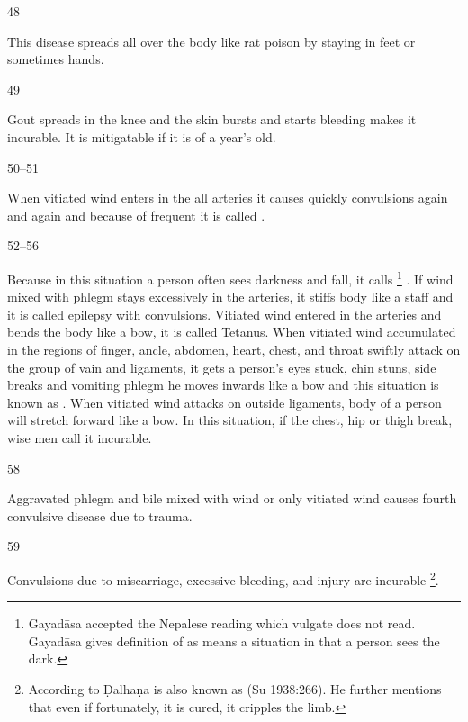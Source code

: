 \begin{translation}
\item[48]

	This disease spreads all over the body like rat poison by staying in
	feet or sometimes hands.

\item[49]

	Gout spreads in the knee and the skin bursts and starts bleeding makes
	it incurable. It is mitigatable if it is of a year’s old.

\item[50--51]

	When vitiated wind enters in the all arteries it causes quickly
	convulsions again and again and because of frequent
	 it is called .

\item[52--56]

	Because in this situation a person often sees darkness and fall, it
	calls  \footnote{Gayadāsa accepted
	the Nepalese reading  which vulgate does not read.  Gayadāsa
	gives definition of  as  means a situation in
	that a person sees the dark.} . If wind mixed with phlegm stays
	excessively in the arteries, it stiffs body like a staff and it is
	called  epilepsy with convulsions. Vitiated wind entered
	in the arteries and bends the body like a bow, it is called
	 Tetanus. When vitiated wind accumulated in the regions of
	finger, ancle, abdomen, heart, chest, and throat swiftly attack on the
	group of vain and ligaments, it gets a person’s eyes stuck, chin stuns,
	side breaks and vomiting phlegm he moves inwards like a bow and this
	situation is known as . When vitiated
	wind attacks on outside ligaments, body of a person will stretch forward
	like a bow. In this situation, if the chest, hip or thigh break, wise
	men call it incurable.

\item[58]

	Aggravated phlegm and bile mixed with wind or only vitiated wind causes
	fourth convulsive disease due to trauma.

\item[59]

	Convulsions due to miscarriage, excessive bleeding, and injury are
	incurable \footnote{According to Ḍalhaṇa  is
	also known as  (Su 1938:266). He further mentions that even
	if fortunately, it is cured, it cripples the limb.}.


\end{translation}
